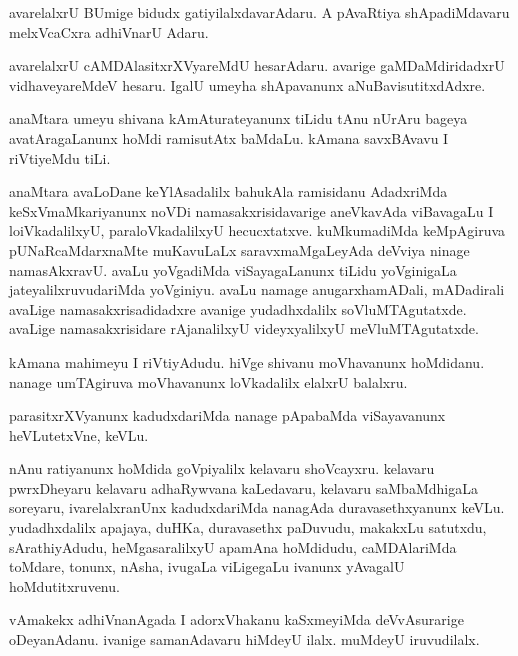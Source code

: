 \documentclass{article}
\begin{document}
\begin{mng}%
avarelalxrU BUmige bidudx gatiyilalxdavarAdaru. A pAvaRtiya
shApadiMdavaru melxVcaCxra adhiVnarU Adaru.
\end{mng}

\begin{mng}%
avarelalxrU cAMDAlasitxrXVyareMdU hesarAdaru. avarige gaMDaMdiridadxrU
vidhaveyareMdeV hesaru. IgalU umeyha shApavanunx aNuBavisutitxdAdxre.
\end{mng}

\begin{mng}%
anaMtara umeyu shivana kAmAturateyanunx tiLidu tAnu
nUrAru bageya avatAragaLanunx hoMdi ramisutAtx baMdaLu. kAmana
savxBAvavu I riVtiyeMdu tiLi.
\end{mng}

\begin{mng}%
anaMtara avaLoDane keYlAsadalilx bahukAla ramisidanu
AdadxriMda keSxVmaMkariyanunx noVDi namasakxrisidavarige aneVkavAda viBavagaLu
I loiVkadalilxyU, paraloVkadalilxyU hecucxtatxve. kuMkumadiMda keMpAgiruva
pUNaRcaMdarxnaMte muKavuLaLx saravxmaMgaLeyAda deVviya ninage
namasAkxravU. avaLu yoVgadiMda viSayagaLanunx tiLidu yoVginigaLa jateyalilxruvudariMda 
yoVginiyu. avaLu namage anugarxhamADali, mADadirali
avaLige namasakxrisadidadxre avanige yudadhxdalilx soVluMTAgutatxde. avaLige
namasakxrisidare rAjanalilxyU videyxyalilxyU meVluMTAgutatxde.
\end{mng}

\begin{mng}%
kAmana mahimeyu I riVtiyAdudu. hiVge shivanu moVhavanunx hoMdidanu.
nanage umTAgiruva moVhavanunx loVkadalilx elalxrU
balalxru.
\end{mng}

\begin{mng}%
parasitxrXVyanunx kadudxdariMda nanage pApabaMda viSayavanunx
heVLutetxVne, keVLu.
\end{mng}

\begin{mng}%
nAnu ratiyanunx hoMdida goVpiyalilx kelavaru
shoVcayxru. kelavaru pwrxDheyaru kelavaru adhaRywvana kaLedavaru, kelavaru 
saMbaMdhigaLa soreyaru, ivarelalxranUnx kadudxdariMda nanagAda duravasethxyanunx
keVLu. yudadhxdalilx apajaya, duHKa, duravasethx paDuvudu, makakxLu
satutxdu, sArathiyAdudu, heMgasaralilxyU apamAna hoMdidudu, caMDAlariMda
toMdare, tonunx, nAsha, ivugaLa viLigegaLu ivanunx yAvagalU hoMdutitxruvenu.
\end{mng}

\begin{mng}%
vAmakekx adhiVnanAgada I adorxVhakanu kaSxmeyiMda deVvAsurarige
oDeyanAdanu. ivanige samanAdavaru hiMdeyU ilalx. muMdeyU
iruvudilalx.
\end{mng}
\end{document}
